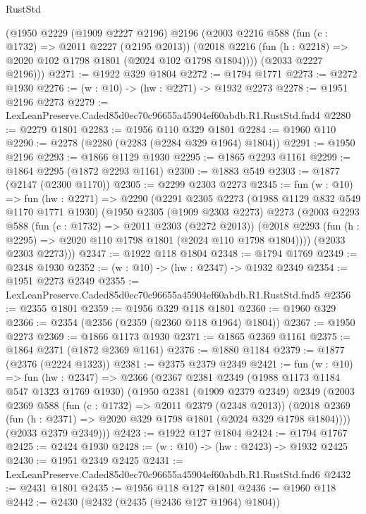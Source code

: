 \begin{lexlean}{RustStd}
\begin{coremodule}
      (@1950
        @2229
        (@1909 @2227 @2196)
        @2196
        (@2003
          @2216
          @588
          (fun (c : @1732) => @2011 @2227 (@2195 @2013))
          (@2018 @2216 (fun (h : @2218) => @2020 @102 @1798 @1801 (@2024 @102 @1798 @1804))))
        (@2033 @2227 @2196)))
@2271 := @1922 @329 @1804
@2272 := @1794 @1771
@2273 := @2272 @1930
@2276 := (w : @10) -> (hw : @2271) -> @1932 @2273
@2278 := @1951 @2196 @2273
@2279 := LexLeanPreserve.Caded85d0ec70c96655a45904ef60abdb.R1.RustStd.fnd4
@2280 := @2279 @1801
@2283 := @1956 @110 @329 @1801
@2284 := @1960 @110
@2290 := @2278 (@2280 (@2283 (@2284 @329 @1964) @1804))
@2291 := @1950 @2196
@2293 := @1866 @1129 @1930
@2295 := @1865 @2293 @1161
@2299 := @1864 @2295 (@1872 @2293 @1161)
@2300 := @1883 @549
@2303 := @1877 (@2147 (@2300 @1170))
@2305 := @2299 @2303 @2273
@2345 := fun (w : @10) =>
  fun (hw : @2271) =>
  @2290
    (@2291
      @2305
      @2273
      (@1988 @1129 @832 @549 @1170 @1771 @1930)
      (@1950
        @2305
        (@1909 @2303 @2273)
        @2273
        (@2003
          @2293
          @588
          (fun (c : @1732) => @2011 @2303 (@2272 @2013))
          (@2018 @2293 (fun (h : @2295) => @2020 @110 @1798 @1801 (@2024 @110 @1798 @1804))))
        (@2033 @2303 @2273)))
@2347 := @1922 @118 @1804
@2348 := @1794 @1769
@2349 := @2348 @1930
@2352 := (w : @10) -> (hw : @2347) -> @1932 @2349
@2354 := @1951 @2273 @2349
@2355 := LexLeanPreserve.Caded85d0ec70c96655a45904ef60abdb.R1.RustStd.fnd5
@2356 := @2355 @1801
@2359 := @1956 @329 @118 @1801
@2360 := @1960 @329
@2366 := @2354 (@2356 (@2359 (@2360 @118 @1964) @1804))
@2367 := @1950 @2273
@2369 := @1866 @1173 @1930
@2371 := @1865 @2369 @1161
@2375 := @1864 @2371 (@1872 @2369 @1161)
@2376 := @1880 @1184
@2379 := @1877 (@2376 (@2224 @1323))
@2381 := @2375 @2379 @2349
@2421 := fun (w : @10) =>
  fun (hw : @2347) =>
  @2366
    (@2367
      @2381
      @2349
      (@1988 @1173 @1184 @547 @1323 @1769 @1930)
      (@1950
        @2381
        (@1909 @2379 @2349)
        @2349
        (@2003
          @2369
          @588
          (fun (c : @1732) => @2011 @2379 (@2348 @2013))
          (@2018 @2369 (fun (h : @2371) => @2020 @329 @1798 @1801 (@2024 @329 @1798 @1804))))
        (@2033 @2379 @2349)))
@2423 := @1922 @127 @1804
@2424 := @1794 @1767
@2425 := @2424 @1930
@2428 := (w : @10) -> (hw : @2423) -> @1932 @2425
@2430 := @1951 @2349 @2425
@2431 := LexLeanPreserve.Caded85d0ec70c96655a45904ef60abdb.R1.RustStd.fnd6
@2432 := @2431 @1801
@2435 := @1956 @118 @127 @1801
@2436 := @1960 @118
@2442 := @2430 (@2432 (@2435 (@2436 @127 @1964) @1804))

\end{coremodule}
\end{lexlean}
